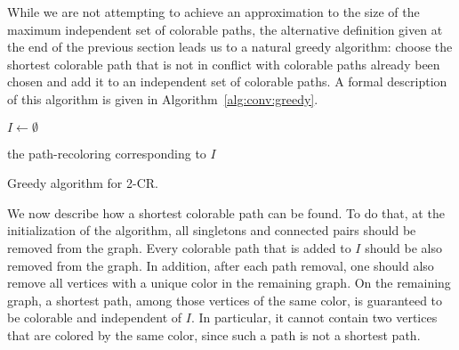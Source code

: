 While we are not attempting to achieve an approximation to the size
of the maximum independent set of colorable paths,
the alternative definition given at the end of the previous section
leads us to a natural greedy algorithm: 
choose the shortest colorable path that 
is not in conflict with colorable paths already been chosen and add it
to an independent set of colorable paths.
%
A formal description of this algorithm is given in
Algorithm~\ref{alg:conv:greedy}.



\begin{algorithm}
$I \gets \emptyset$

\Return the path-recoloring corresponding to $I$

\caption{Greedy algorithm for 2-CR.}
\label{alg:conv:greedy}
\end{algorithm}


We now describe how a shortest colorable path can be found.
%
To do that, 
at the initialization of the algorithm, 
all singletons and connected pairs should be removed from the graph.  
%
Every colorable path that is added to $I$ should be also removed from the graph.  
%
In addition, 
after each path removal, 
one should also remove all vertices with a unique color in the remaining graph.  
%
On the remaining graph, 
a shortest path, 
among those vertices of the same color, 
is guaranteed to be colorable and independent of $I$.
%
In particular,
it cannot contain two vertices that are colored by the same color, 
since such a path is not a shortest path.
